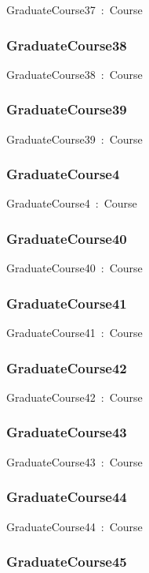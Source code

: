 \documentclass{article}
\begin{document}
GraduateCourse37~:~Course

\subsubsection*{GraduateCourse38}

GraduateCourse38~:~Course

\subsubsection*{GraduateCourse39}

GraduateCourse39~:~Course

\subsubsection*{GraduateCourse4}

GraduateCourse4~:~Course

\subsubsection*{GraduateCourse40}

GraduateCourse40~:~Course

\subsubsection*{GraduateCourse41}

GraduateCourse41~:~Course

\subsubsection*{GraduateCourse42}

GraduateCourse42~:~Course

\subsubsection*{GraduateCourse43}

GraduateCourse43~:~Course

\subsubsection*{GraduateCourse44}

GraduateCourse44~:~Course

\subsubsection*{GraduateCourse45}
\end{document}
